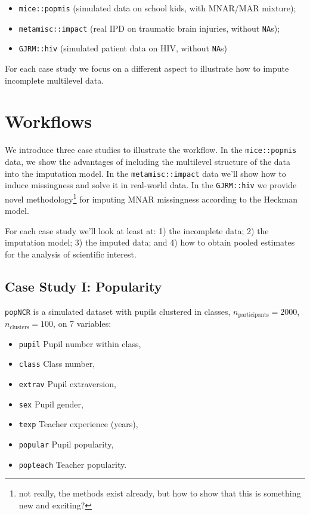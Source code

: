 \documentclass[
]{jss}
\providecommand{\tightlist}{%
  \setlength{\itemsep}{0pt}\setlength{\parskip}{0pt}}
\begin{document}
\begin{itemize}
\item
  \texttt{mice::popmis} (simulated data on school kids, with MNAR/MAR
  mixture);
\item
  \texttt{metamisc::impact} (real IPD on traumatic brain injuries,
  without \texttt{NA}s);
\item
  \texttt{GJRM::hiv} (simulated patient data on HIV, without
  \texttt{NA}s)
\end{itemize}

For each case study we focus on a different aspect to illustrate how to
impute incomplete multilevel data.

\hypertarget{workflows}{%
\section{Workflows}\label{workflows}}

We introduce three case studies to illustrate the workflow. In the
\texttt{mice::popmis} data, we show the advantages of including the
multilevel structure of the data into the imputation model. In the
\texttt{metamisc::impact} data we'll show how to induce missingness and
solve it in real-world data. In the \texttt{GJRM::hiv} we provide novel
methodology\footnote{not really, the methods exist already, but how to
  show that this is something new and exciting?} for imputing MNAR
missingness according to the Heckman model.

For each case study we'll look at least at: 1) the incomplete data; 2)
the imputation model; 3) the imputed data; and 4) how to obtain pooled
estimates for the analysis of scientific interest.

\hypertarget{case-study-i-popularity}{%
\subsection{Case Study I: Popularity}\label{case-study-i-popularity}}

\texttt{popNCR} is a simulated dataset with pupils clustered in classes,
\(n_{\text{participants}} = 2000\), \(n_{\text{clusters}} = 100\), on 7
variables:

\begin{itemize}
\tightlist
\item
  \texttt{pupil} Pupil number within class,
\item
  \texttt{class} Class number,
\item
  \texttt{extrav} Pupil extraversion,
\item
  \texttt{sex} Pupil gender,
\item
  \texttt{texp} Teacher experience (years),
\item
  \texttt{popular} Pupil popularity,
\item
  \texttt{popteach} Teacher popularity.
\end{itemize}
\end{document}

